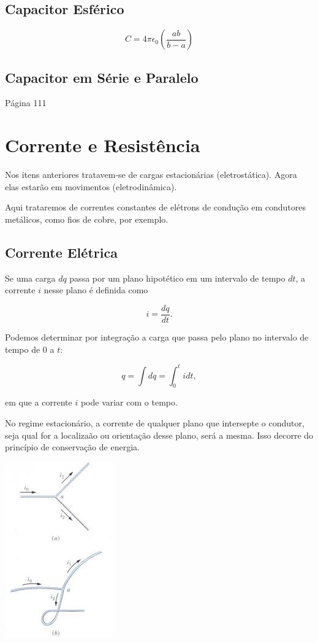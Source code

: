 \subsection{Capacitor Esférico}

\begin{equation}
    C=4\pi \epsilon_0 \left( \dfrac{ab}{b-a} \right)
\end{equation}

\subsection{Capacitor em Série e Paralelo}
Página 111

\section{Corrente e Resistência}
Nos itens anteriores tratavem-se de cargas estacionárias (eletrostática). Agora elas estarão em movimentos (eletrodinâmica).

Aqui trataremos de correntes constantes de elétrons de condução em condutores metálicos, como fios de cobre, por exemplo.

\subsection{Corrente Elétrica}
Se uma carga $dq$ passa por um plano hipotético em um intervalo de tempo $dt$, a corrente $i$ nesse plano é definida como

\begin{equation}
    i=\dfrac{dq}{dt}.
\end{equation}

Podemos determinar por integração a carga que passa pelo plano no intervalo de tempo de $0$ a $t$:

\begin{equation}
    q=\int dq=\int_0^t i dt,
\end{equation}

em que a corrente $i$ pode variar com o tempo.



No regime estacionário, a corrente de qualquer plano que intersepte o condutor, seja qual for a localizaão ou orientação desse plano, será a mesma. Isso decorre do princípio de conservação de energia.

\begin{center}
\includegraphics[scale=.7]{./imagens/26.jpg}
\end{center}


